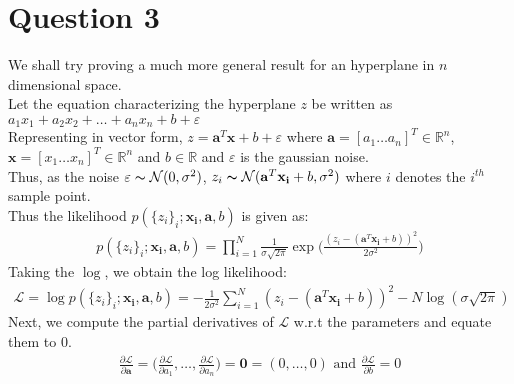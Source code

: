 \documentclass[11pt, fleqn]{article}
\begin{document}
\section*{Question 3}
\setcounter{equation}{0}
\setcounter{figure}{0}
We shall try proving a much more general result for an hyperplane in $n$ dimensional space.\\
Let the equation characterizing the hyperplane $z$ be written as $a_1x_1 + a_2x_2 + \ldots + a_nx_n + b + \varepsilon $\\
Representing in vector form, $z = \mathbf{a}^T\mathbf{x} + b + \varepsilon$ where $\mathbf{a} = [a_1 \ldots a_n]^T \in \mathbb{R}^n$, $\mathbf{x} = [x_1 \ldots x_n]^T \in \mathbb{R}^n$ and $b \in \mathbb{R}$ and $\varepsilon$ is the gaussian noise.\\
Thus, as the noise $\varepsilon \thicksim \mathcal{N}(0, \sigma^2)$, 
$ z_i \thicksim \mathcal{N}( \mathbf{a}^T\mathbf{x_i}+b, \sigma^2) $ where $i$ denotes the $i^{th}$ sample point.\\
Thus the likelihood $p(\{z_i\}_i;\mathbf{x_i}, \mathbf{a}, b)$ is given as:
\begin{equation*}
    \begin{split}
        p(\{z_i\}_i;\mathbf{x_i}, \mathbf{a}, b) = \prod_{i=1}^{N}\frac{1}{\sigma\sqrt{2\pi}} \exp{\bigg(\frac{(z_i - (\mathbf{a}^T\mathbf{x_i} + b))^2}{2\sigma^2}\bigg)}
    \end{split}
\end{equation*}
Taking the $\log$, we obtain the log likelihood:
\begin{equation}
    \label{logl}
    \begin{split}
        \boxed{\mathcal{L} = \log{p(\{z_i\}_i;\mathbf{x_i}, \mathbf{a}, b)} = -\frac{1}{{2\sigma^2}}\sum_{i=1}^{N} (z_i - (\mathbf{a}^T\mathbf{x_i} + b))^2 - N\log(\sigma\sqrt{2\pi})}
    \end{split}
\end{equation}
Next, we compute the partial derivatives of $\mathcal{L}$ w.r.t the parameters and equate them to 0.
\begin{equation*}
    \begin{split}
        \frac{\partial \mathcal{L}}{\partial \mathbf{a}} = \bigg( \frac{\partial \mathcal{L}}{\partial a_1}, \ldots, \frac{\partial \mathcal{L}}{\partial a_n} \bigg) = \mathbf{0} = (0, \dots, 0) \text{ and } \frac{\partial \mathcal{L}}{\partial b} = 0 
    \end{split}
\end{equation*}
\end{document}
